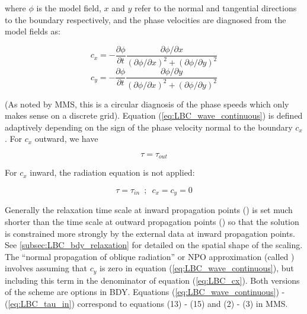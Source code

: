 \documentclass[../main/NEMO_manual]{subfiles}
\begin{document}
where $\phi$ is the model field, $x$ and $y$ refer to the normal and tangential directions to the boundary respectively, and the phase
velocities are diagnosed from the model fields as:

\begin{equation}
  \label{eq:LBC_cx}
  c_x = -\frac{\partial\phi}{\partial t}\frac{\partial\phi / \partial x}{(\partial\phi /\partial x)^2 + (\partial\phi /\partial y)^2}
\end{equation}
\begin{equation}
  \label{eq:LBC_cy}
  c_y = -\frac{\partial\phi}{\partial t}\frac{\partial\phi / \partial y}{(\partial\phi /\partial x)^2 + (\partial\phi /\partial y)^2}
\end{equation}

(As noted by MMS, this is a circular diagnosis of the phase speeds which only makes sense on a discrete grid).
Equation (\autoref{eq:LBC_wave_continuous}) is defined adaptively depending on the sign of the phase velocity normal to the boundary $c_x$.
For $c_x$ outward, we have

\begin{equation}
\tau = \tau_{out}
\end{equation}

For $c_x$ inward, the radiation equation is not applied:

\begin{equation}
  \label{eq:LBC_tau_in}
  \tau = \tau_{in}\,\,\,;\,\,\, c_x = c_y = 0
\end{equation}

Generally the relaxation time scale at inward propagation points () is set much shorter than the time scale at outward propagation
points () so that the solution is constrained more strongly by the external data at inward propagation points.
See \autoref{subsec:LBC_bdy_relaxation} for detailed on the spatial shape of the scaling.\\
The ``normal propagation of oblique radiation'' or NPO approximation (called ) involves assuming
that $c_y$ is zero in equation (\autoref{eq:LBC_wave_continuous}), but including
this term in the denominator of equation (\autoref{eq:LBC_cx}). Both versions of the scheme are options in BDY. Equations
(\autoref{eq:LBC_wave_continuous}) - (\autoref{eq:LBC_tau_in}) correspond to equations (13) - (15) and (2) - (3) in MMS.\\

\end{document}

